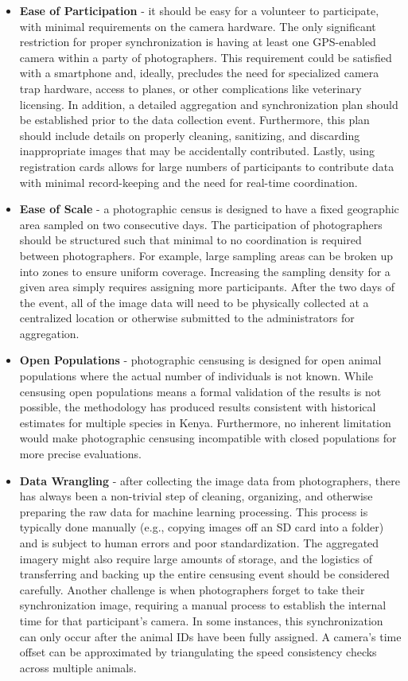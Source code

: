 \begin{itemize}
    \item \textbf{Ease of Participation} - it should be easy for a volunteer to participate, with minimal requirements on the camera hardware.  The only significant restriction for proper synchronization is having at least one GPS-enabled camera within a party of photographers.  This requirement could be satisfied with a smartphone and, ideally, precludes the need for specialized camera trap hardware, access to planes, or other complications like veterinary licensing. In addition, a detailed aggregation and synchronization plan should be established prior to the data collection event.  Furthermore, this plan should include details on properly cleaning, sanitizing, and discarding inappropriate images that may be accidentally contributed.  Lastly, using registration cards allows for large numbers of participants to contribute data with minimal record-keeping and the need for real-time coordination.
    \item \textbf{Ease of Scale} - a photographic census is designed to have a fixed geographic area sampled on two consecutive days.  The participation of photographers should be structured such that minimal to no coordination is required between photographers. For example, large sampling areas can be broken up into zones to ensure uniform coverage. Increasing the sampling density for a given area simply requires assigning more participants.  After the two days of the event, all of the image data will need to be physically collected at a centralized location or otherwise submitted to the administrators for aggregation.
    \item \textbf{Open Populations} - photographic censusing is designed for open animal populations where the actual number of individuals is not known.  While censusing open populations means a formal validation of the results is not possible, the methodology has produced results consistent with historical estimates for multiple species in Kenya.  Furthermore, no inherent limitation would make photographic censusing incompatible with closed populations for more precise evaluations.
    \item \textbf{Data Wrangling} - after collecting the image data from photographers, there has always been a non-trivial step of cleaning, organizing, and otherwise preparing the raw data for machine learning processing.  This process is typically done manually (e.g., copying images off an SD card into a folder) and is subject to human errors and poor standardization.  The aggregated imagery might also require large amounts of storage, and the logistics of transferring and backing up the entire censusing event should be considered carefully.  Another challenge is when photographers forget to take their synchronization image, requiring a manual process to establish the internal time for that participant's camera.  In some instances, this synchronization can only occur after the animal IDs have been fully assigned.  A camera's time offset can be approximated by triangulating the speed consistency checks across multiple animals.

\end{itemize}
